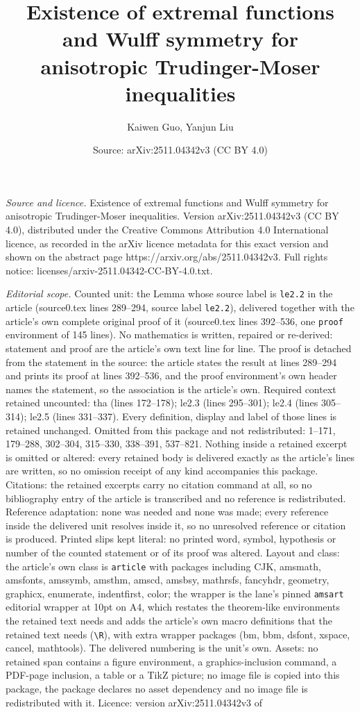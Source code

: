 \documentclass[10pt,a4paper]{amsart}
\title[Existence of extremal functions and Wulff symmetry for aniso]{Existence of extremal functions and Wulff symmetry for anisotropic Trudinger-Moser inequalities}
\author{Kaiwen Guo, Yanjun Liu}
\date{Source: arXiv:2511.04342v3 (CC BY 4.0)}
\begin{document}
\maketitle

\noindent\emph{Source and licence.} Existence of extremal functions and Wulff symmetry for anisotropic Trudinger-Moser inequalities. Version arXiv:2511.04342v3 (CC BY 4.0), distributed under the Creative Commons Attribution 4.0 International licence, as recorded in the arXiv licence metadata for this exact version and shown on the abstract page https://arxiv.org/abs/2511.04342v3. Full rights notice: licenses/arxiv-2511.04342-CC-BY-4.0.txt.\par\smallskip

\noindent\textit{Editorial scope.} Counted unit: the Lemma whose source label is \texttt{le2.2} in the article (source0.tex lines 289--294, source label \texttt{le2.2}), delivered together with the article's own complete original proof of it (source0.tex lines 392--536, one \texttt{proof} environment of 145 lines). No mathematics is written, repaired or re-derived: statement and proof are the article's own text line for line. The proof is detached from the statement in the source: the article states the result at lines 289--294 and prints its proof at lines 392--536, and the proof environment's own header names the statement, so the association is the article's own. Required context retained uncounted: tha (lines 172--178); le2.3 (lines 295--301); le2.4 (lines 305--314); le2.5 (lines 331--337). Every definition, display and label of those lines is retained unchanged. Omitted from this package and not redistributed: 1--171, 179--288, 302--304, 315--330, 338--391, 537--821. Nothing inside a retained excerpt is omitted or altered: every retained body is delivered exactly as the article's lines are written, so no omission receipt of any kind accompanies this package. Citations: the retained excerpts carry no citation command at all, so no bibliography entry of the article is transcribed and no reference is redistributed. Reference adaptation: none was needed and none was made; every reference inside the delivered unit resolves inside it, so no unresolved reference or citation is produced. Printed slips kept literal: no printed word, symbol, hypothesis or number of the counted statement or of its proof was altered. Layout and class: the article's own class is \texttt{article} with packages including CJK, amsmath, amsfonts, amssymb, amsthm, amscd, amsbsy, mathrsfs, fancyhdr, geometry, graphicx, enumerate, indentfirst, color; the wrapper is the lane's pinned \texttt{amsart} editorial wrapper at 10pt on A4, which restates the theorem-like environments the retained text needs and adds the article's own macro definitions that the retained text needs (\texttt{\textbackslash R}), with extra wrapper packages (bm, bbm, dsfont, xspace, cancel, mathtools). The delivered numbering is the unit's own. Assets: no retained span contains a figure environment, a graphics-inclusion command, a PDF-page inclusion, a table or a TikZ picture; no image file is copied into this package, the package declares no asset dependency and no image file is redistributed with it. Licence: version arXiv:2511.04342v3 of 
\end{document}
